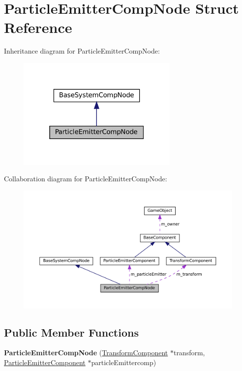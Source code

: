 \hypertarget{structParticleEmitterCompNode}{}\section{Particle\+Emitter\+Comp\+Node Struct Reference}
\label{structParticleEmitterCompNode}


Inheritance diagram for Particle\+Emitter\+Comp\+Node\+:
\nopagebreak
\begin{figure}[H]
\begin{center}
\leavevmode
\includegraphics[width=223pt]{structParticleEmitterCompNode__inherit__graph}
\end{center}
\end{figure}


Collaboration diagram for Particle\+Emitter\+Comp\+Node\+:
\nopagebreak
\begin{figure}[H]
\begin{center}
\leavevmode
\includegraphics[width=350pt]{structParticleEmitterCompNode__coll__graph}
\end{center}
\end{figure}
\subsection*{Public Member Functions}
\begin{DoxyCompactItemize}
\item 
\mbox{\label{structParticleEmitterCompNode_a2679defaa00600d4179a54e2754c9e07}} 
{\bfseries Particle\+Emitter\+Comp\+Node} (\hyperlink{classTransformComponent}{Transform\+Component} $\ast$transform, \hyperlink{classParticleEmitterComponent}{Particle\+Emitter\+Component} $\ast$particle\+Emittercomp)
\end{DoxyCompactItemize}
